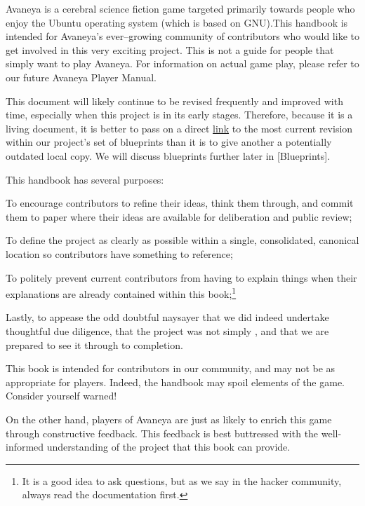 

Avaneya is a cerebral science fiction game targeted primarily towards people who enjoy the Ubuntu operating system (which is based on GNU). This handbook is intended for Avaneya's ever--growing community of contributors who would like to get involved in this very exciting project. This is not a guide for people that simply want to play Avaneya. For information on actual game play, please refer to our future Avaneya Player Manual.

This document will likely continue to be revised frequently and improved with time, especially when this project is in its early stages. Therefore, because it is a living document, it is better to pass on a direct \href{\LatestHandbookURL}{link} to the most current revision within our project's set of blueprints than it is to give another a potentially outdated local copy. We will discuss blueprints further later in [Blueprints].

This handbook has several purposes:

\startitemize[4]
\item
To encourage contributors to refine their ideas, think them through, and commit them to paper where their ideas are available for deliberation and public review;

\item
To define the project as clearly as possible within a single, consolidated, canonical location so contributors have something to reference;

\item
To politely prevent current contributors from having to explain things when their explanations are already contained within this book;\footnote[rtfm]{It is a good idea to ask questions, but as we say in the hacker community, always read the documentation first.}

\item
Lastly, to appease the odd doubtful naysayer that we did indeed undertake thoughtful due diligence, that the project was not simply , and that we are prepared to see it through to completion.
\stopitemize

This book is intended for contributors in our community, and may not be as appropriate for players. Indeed, the handbook may spoil elements of the game. Consider yourself warned!

On the other hand, players of Avaneya are just as likely to enrich this game through constructive feedback. This feedback is best buttressed with the well-informed understanding of the project that this book can provide.

\StopChapter
